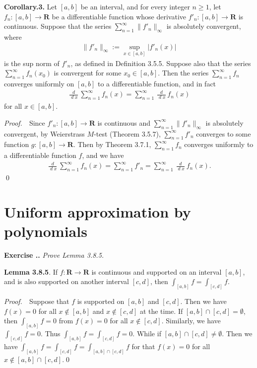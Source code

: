\documentclass{book}
\DeclareMathOperator{\dd}{\mathit{d}}%
\newcommand{\pff}{\vspace{.25em}\noindent\emph{Proof.}~~}
\newcommand{\titl}[1]{\noindent\textbf{#1}}
\newcounter{Exercise}[section]
\renewcommand{\theExercise}{\thesection.\arabic{Exercise}.}
\newcommand{\new}{\vspace{1.5em}\noindent\textbf{Exercise \stepcounter{Exercise}\textbf{\theExercise}} }
\begin{document}
\begin{framed}
\titl{Corollary.3.} Let $[a, b]$ be an interval, and for every integer $n \geq 1$, let $f_n : [a, b] \to \mathbf{R}$ be a differentiable function whose derivative $f'_n: [a, b] \to \mathbf{R}$ is continuous. Suppose that the series $\sum_{n = 1}^{\infty} \| f'_n \|_{\infty}$ is absolutely convergent, where
    \begin{align*}
        \| f'_n \|_{\infty} := \sup_{x \in [a, b]} |f'_n(x)|
    \end{align*}
is the sup norm of $f'_n$, as defined in Definition 3.5.5. Suppose also that the series $\sum_{n = 1}^{\infty} f_n(x_0)$ is convergent for some $x_0 \in [a, b]$. Then the series $\sum_{n = 1}^{\infty} f_n$ converges uniformly on $[a, b]$ to a differentiable function, and in fact
    \begin{align*}
        \frac{\dd}{\dd x}\sum_{n = 1}^{\infty} f_n(x)
        = \sum_{n = 1}^{\infty}\frac{\dd}{\dd x} f_n(x)
    \end{align*}
for all $x \in [a, b]$.
\end{framed}

\pff Since $f'_n : [a, b] \to \mathbf{R}$ is continuous and $\sum_{n = 1}^{\infty} \| f'_n \|_{\infty}$ is absolutely convergent, by Weierstrass $M$-test (Theorem 3.5.7), $\sum_{n = 1}^{\infty} f'_n$ converges to some function $g : [a, b] \to \mathbf{R}$. Then by Theorem 3.7.1, $\sum_{n = 1}^{\infty} f_n$ converges uniformly to a differentiable function $f$, and we have
    \begin{align*}
        \frac{\dd}{\dd x}\sum_{n = 1}^{\infty} f_n(x)
        = \sum_{n = 1}^{\infty} f'_n
        = \sum_{n = 1}^{\infty}\frac{\dd}{\dd x} f_n(x).
    \end{align*}\qed

\section{Uniform approximation by polynomials}

\new\emph{Prove Lemma 3.8.5.}

\begin{framed}
\titl{Lemma 3.8.5}. If $f : \mathbf{R} \to \mathbf{R}$ is continuous and supported on an interval $[a, b]$, and is also supported on another interval $[c, d]$, then $\int_{[a,b]} f = \int_{[c,d]} f$.
\end{framed}

\pff Suppose that $f$ is supported on $[a, b]$ and $[c, d]$. Then we have $f(x) = 0$ for all $x \notin [a, b]$ and $x \notin [c, d]$ at the time. If $[a, b] \cap [c, d] = \emptyset$, then $\int_{[a, b]} f = 0$ from $f(x) = 0$ for all $x \notin [c, d]$. Similarly, we have $\int_{[c, d]} f = 0$. Thus $\int_{[a,b]} f = \int_{[c,d]} f = 0$. While if $[a, b] \cap [c, d] \neq \emptyset$. Then we have $\int_{[a,b]} f = \int_{[c,d]} f = \int_{[a, b] \cap [c, d]} f$ for that $f(x) = 0$ for all $x \notin [a, b] \cap [c, d]$.\qed
\end{document}
